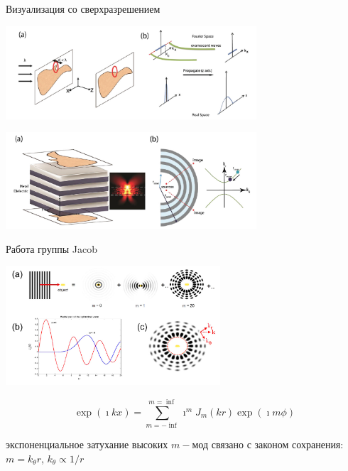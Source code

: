 \documentclass[9pt, compress, xcolor=table]{beamer}
\begin{document}
\begin{frame}{Визуализация со сверхразрешением}
\begin{center}
\includegraphics[width=0.7\textwidth]{neg_ref_n4}

\includegraphics[width=0.7\textwidth]{neg_ref_n1}
\end{center}
\end{frame}


\begin{frame}{Работа группы Jacob}
\begin{center}
\includegraphics[width=8cm]{neg_ref_43}
\end{center}

\begin{center}
\begin{equation*}
\exp (\imath k x) = \sum_{m=-\inf}^{m=\inf} \imath^m J_m(kr) \exp(\imath m \phi)
\end{equation*}
\end{center}
экспоненциальное затухание высоких $m-$мод связано с законом сохранения: $m=k_{\theta}r$,
$k_{\theta}\propto 1/r$
\end{frame}
\end{document}
